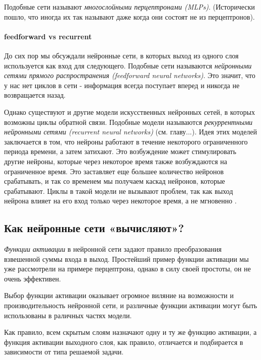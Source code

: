 Подобные сети называют \textit{многослойными перцептронами (MLPs)}. (Исторически пошло, 
что иногда их так называют даже когда они состоят не из перцептронов). 

\paragraph{feedforward vs recurrent}

До сих пор мы обсуждали нейронные сети, в которых выход из одного слоя используется как 
вход для следующего. Подобные сети называются \textit{нейронными сетями прямого распространения 
(feedforward neural networks)}. Это значит, что у нас нет циклов в сети - информация всегда 
поступает вперед и никогда не возвращается назад.

Однако существуют и другие модели искусственных нейронных сетей, 
в которых возможны циклы обратной связи. Подобные модели называются 
\textit{рекуррентными нейронными сетями (recurrent neural networks)} 
(см. {\color{red} главу...}). 
Идея этих моделей заключается в 
том, что нейроны работают в течение некоторого ограниченного периода 
времени, а затем затихают. Это возбуждение может стимулировать другие 
нейроны, которые через некоторое время также возбуждаются на ограниченное 
время. Это заставляет еще большее количество нейронов срабатывать, и 
так со временем мы получаем каскад нейронов, которые срабатывают. Циклы 
в такой модели не вызывают проблем, так как выход нейрона влияет на его 
вход только через некоторое время, а не мгновенно \cite{NN_Nielsen}.

\subsection{Как нейронные сети «вычисляют»?}

\textit{Функции активации} в нейронной сети задают правило преобразования 
взвешенной суммы входа в выход. Простейший пример функции активации мы уже 
рассмотрели на примере перцептрона, однако в силу своей простоты, он не очень 
эффективен. 

Выбор функции активации оказывает огромное виляние на возможности и производительность 
нейронной сети, и различные функции активации могут быть использованы в раличных частях модели.

Как правило, всем скрытым слоям назначают одну и ту же функцию активации, 
а функция активации выходного слоя, как правило, отличается и подбирается в 
зависимости от типа решаемой задачи.

